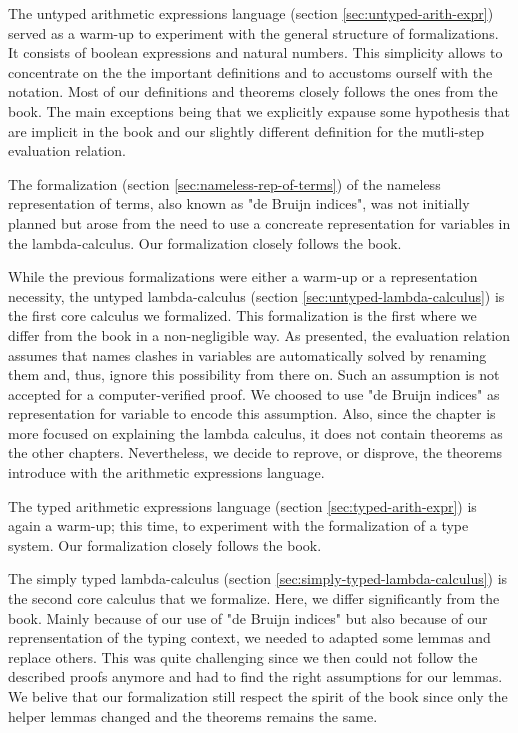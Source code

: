 The untyped arithmetic expressions language (section \ref{sec:untyped-arith-expr}) served as a
warm-up to experiment with the general structure of formalizations. It consists of boolean
expressions and natural numbers. This simplicity allows to concentrate on the the important
definitions and to accustoms ourself with the notation. Most of our definitions and theorems closely
follows the ones from the book. The main exceptions being that we explicitly expause some hypothesis
that are implicit in the book and our slightly different definition for the mutli-step evaluation
relation.

The formalization (section \ref{sec:nameless-rep-of-terms}) of the nameless representation of terms,
also known as "de Bruijn indices", was not initially planned but arose from the need to use a
concreate representation for variables in the lambda-calculus. Our formalization closely follows the
book.

While the previous formalizations were either a warm-up or a representation necessity, the untyped
lambda-calculus (section \ref{sec:untyped-lambda-calculus}) is the first core calculus we
formalized. This formalization is the first where we differ from the book in a non-negligible way.
As presented, the evaluation relation assumes that names clashes in variables are automatically
solved by renaming them and, thus, ignore this possibility from there on. Such an assumption is not
accepted for a computer-verified proof. We choosed to use "de Bruijn indices" as representation for
variable to encode this assumption. Also, since the chapter is more focused on explaining the lambda
calculus, it does not contain theorems as the other chapters. Nevertheless, we decide to reprove, or
disprove, the theorems introduce with the arithmetic expressions language.

The typed arithmetic expressions language (section \ref{sec:typed-arith-expr}) is again a warm-up;
this time, to experiment with the formalization of a type system. Our formalization closely follows
the book.

The simply typed lambda-calculus (section \ref{sec:simply-typed-lambda-calculus}) is the second core
calculus that we formalize. Here, we differ significantly from the book. Mainly because of our use
of "de Bruijn indices" but also because of our reprensentation of the typing context, we needed to
adapted some lemmas and replace others. This was quite challenging since we then could not follow
the described proofs anymore and had to find the right assumptions for our lemmas. We belive that
our formalization still respect the spirit of the book since only the helper lemmas changed and the
theorems remains the same.
